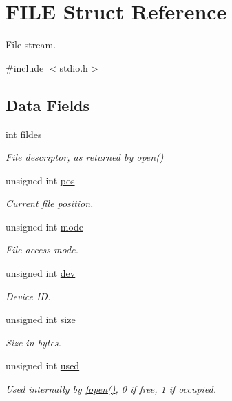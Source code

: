 \hypertarget{structFILE}{}\section{F\+I\+LE Struct Reference}
\label{structFILE}


File stream.  




{\ttfamily \#include $<$stdio.\+h$>$}

\subsection*{Data Fields}
\begin{DoxyCompactItemize}
\item 
int \hyperlink{structFILE_a03eb666eb26d69532cabfd9041848875}{fildes}
\begin{DoxyCompactList}\small\item\em File descriptor, as returned by \hyperlink{fcntl_8h_a3ad75e4ab5b8343998fbdb4b40c0973b}{open()} \end{DoxyCompactList}\item 
unsigned int \hyperlink{structFILE_aad42c1377afb068e9c0f015961657a3c}{pos}
\begin{DoxyCompactList}\small\item\em Current file position. \end{DoxyCompactList}\item 
unsigned int \hyperlink{structFILE_ae65fa42375bf2dd80303a67a562d7783}{mode}
\begin{DoxyCompactList}\small\item\em File access mode. \end{DoxyCompactList}\item 
unsigned int \hyperlink{structFILE_ae0766e84f084e6297ae04c869bd06974}{dev}
\begin{DoxyCompactList}\small\item\em Device ID. \end{DoxyCompactList}\item 
unsigned int \hyperlink{structFILE_a52a41fff17507a76ddf9cd7e1dc41379}{size}
\begin{DoxyCompactList}\small\item\em Size in bytes. \end{DoxyCompactList}\item 
unsigned int \hyperlink{structFILE_a4fe302cf95bc53156809770fd1cc4278}{used}
\begin{DoxyCompactList}\small\item\em Used internally by \hyperlink{stdio_8h_a61171f829f6067fa0c9936fc4e0cbb82}{fopen()}, 0 if free, 1 if occupied. \end{DoxyCompactList}\item 

\end{DoxyCompactItemize}
